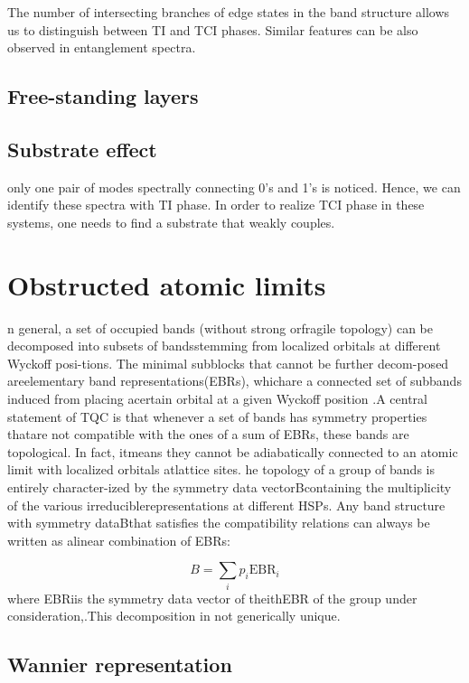 The number of intersecting branches of edge states in the band structure allows us to distinguish between TI and TCI phases. Similar features can be also observed in entanglement spectra.



\subsection{Free-standing layers }
\subsection{Substrate effect }
only one pair of modes spectrally connecting 0’s and 1’s is noticed. Hence, we can identify these spectra with TI phase. In order to realize TCI phase in these systems, one needs to find a substrate that weakly couples.


\section{Obstructed atomic limits}
n  general,  a  set  of  occupied  bands  (without  strong  orfragile  topology)  can  be  decomposed  into  subsets  of  bandsstemming from localized orbitals at different Wyckoff posi-tions. The minimal subblocks that cannot be further decom-posed  areelementary  band  representations(EBRs),  whichare  a  connected  set  of  subbands  induced  from  placing  acertain  orbital  at  a  given  Wyckoff  position  .A central statement of TQC is that whenever a set of bands has symmetry properties thatare not compatible with the ones of a sum of EBRs, these bands are topological.  In fact, itmeans they cannot be adiabatically connected to an atomic limit with localized orbitals atlattice sites. he topology of a group of bands is entirely character-ized by the symmetry data vectorBcontaining the multiplicity of the various irreduciblerepresentations at different HSPs. Any band structure with symmetry dataBthat satisfies the compatibility relations can always be written as alinear combination of EBRs:

\begin{equation}
B = \sum_i p_i \mathrm{EBR}_i
\end{equation}
where EBRiis the symmetry data vector of theithEBR of the group under consideration,.This decomposition in not generically unique. 


\subsection{Wannier representation}

